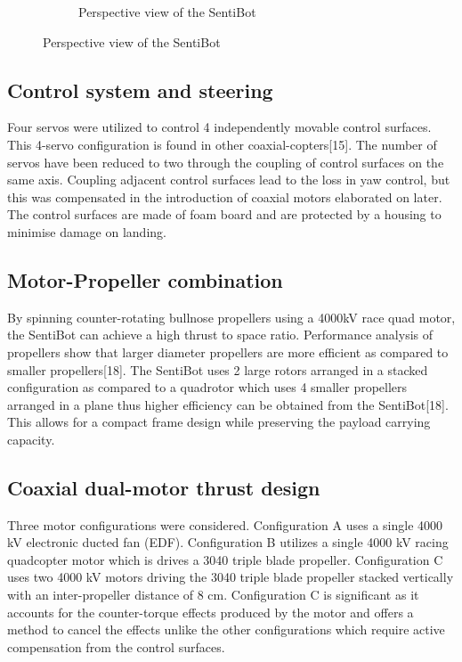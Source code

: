\documentclass[12pt]{article}
\begin{document}
\begin{figure}
\begin{subfigure}{0.5\textwidth}
	\caption{Perspective view of the SentiBot}
	\label{fig:sb-side}
	\end{subfigure}
\end{figure}

\subsection{Control system and steering}

Four servos were utilized to control 4 independently movable control surfaces. This 4-servo configuration is found in other coaxial-copters[15]. The number of servos have been reduced to two through the coupling of control surfaces on the same axis. Coupling adjacent control surfaces lead to the loss in yaw control, but this was compensated in the introduction of coaxial motors elaborated on later. The control surfaces are made of foam board and are protected by a housing to minimise damage on landing. 

\subsection{Motor-Propeller combination}

By spinning counter-rotating bullnose propellers using a 4000kV race quad motor, the SentiBot can achieve a high thrust to space ratio. Performance analysis of propellers show that larger diameter propellers are more efficient as compared to smaller propellers[18]. The SentiBot uses 2 large rotors arranged in a stacked configuration as compared to a quadrotor which uses 4 smaller propellers arranged in a plane thus higher efficiency can be obtained from the SentiBot[18]. This allows for a compact frame design while preserving the payload carrying capacity.

\subsection{Coaxial dual-motor thrust design}

Three motor configurations were considered. Configuration A uses a single 4000 kV electronic ducted fan (EDF).  Configuration B utilizes a single 4000 kV racing quadcopter motor which is drives a 3040 triple blade propeller. Configuration C uses two 4000 kV motors driving the 3040 triple blade propeller stacked vertically with an inter-propeller distance of 8 cm. Configuration C is significant as it accounts for the counter-torque effects produced by the motor and offers a method to cancel the effects unlike the other configurations which require active compensation from the control surfaces.
\end{document}
